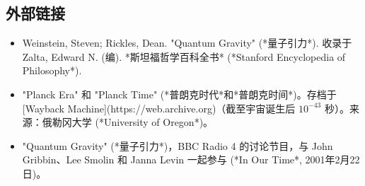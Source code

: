 \subsection{外部链接}
\begin{itemize}
\item Weinstein, Steven; Rickles, Dean. "Quantum Gravity" (*量子引力*). 收录于 Zalta, Edward N. (编). *斯坦福哲学百科全书* (*Stanford Encyclopedia of Philosophy*).
\item "Planck Era" 和 "Planck Time" (*普朗克时代*和*普朗克时间*)。存档于 [Wayback Machine](https://web.archive.org)（截至宇宙诞生后 \(10^{-43}\) 秒）。来源：俄勒冈大学 (*University of Oregon*)。
\item "Quantum Gravity" (*量子引力*)，BBC Radio 4 的讨论节目，与 John Gribbin、Lee Smolin 和 Janna Levin 一起参与 (*In Our Time*, 2001年2月22日)。
\end{itemize}